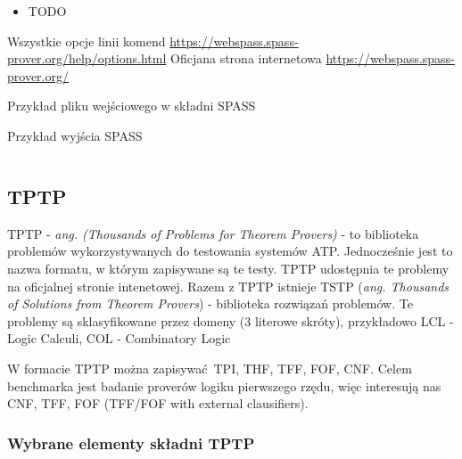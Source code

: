 \documentclass[a4paper,12pt]{article}
\newenvironment{longlisting}{\captionsetup{type=listing}}{}
\begin{document}
\begin{itemize}
  \item TODO
\end{itemize}

\noindent
Wszystkie opcje linii komend \url{https://webspass.spass-prover.org/help/options.html}
\noindent \newline
Oficjana strona internetowa \url{https://webspass.spass-prover.org/}

\begin{longlisting}
  \caption{Przykład pliku wejściowego w składni SPASS}
\end{longlisting}

\begin{longlisting}
  \caption{Przykład wyjścia SPASS}
  \inputminted{text}{listings/spass_example.out}
\end{longlisting}

\subsection{TPTP}

TPTP - \textit{ang. (Thousands of Problems for Theorem Provers)} - to biblioteka problemów wykorzystywanych do testowania systemów \gls{ATP}. Jednocześnie jest to nazwa formatu, w którym zapisywane są te testy. TPTP udostępnia te problemy na oficjalnej stronie intenetowej. Razem z TPTP istnieje TSTP (\textit{ang. Thousands of Solutions from Theorem Provers}) - biblioteka rozwiązań problemów.
Te problemy są sklasyfikowane przez domeny (3 literowe skróty), przykładowo LCL - Logic Calculi, COL - Combinatory Logic

W formacie TPTP można zapisywać \gls{TPI}, \gls{THF}, \gls{TFF}, \gls{FOF}, \gls{CNF}. Celem benchmarka jest badanie proverów logiku pierwszego rzędu, więc interesują nas \gls{CNF}, \gls{TFF}, \gls{FOF} (TFF/FOF with external clausifiers).

\subsubsection{Wybrane elementy składni TPTP}
\end{document}
